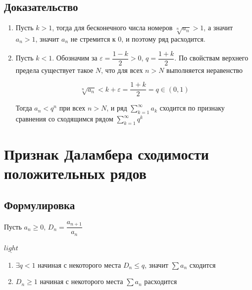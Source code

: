 \documentclass{article}
\begin{document}
        \subsection{Доказательство}
        
            \begin{enumerate}
            
                \item Пусть $k > 1$, тогда для бесконечного числа номеров $\sqrt[n]{a_n} > 1$, а значит $a_n > 1$, значит $a_n$ не стремится к $0$, и поэтому ряд расходится.
                
                \item Пусть $k < 1$. Обозначим за $\varepsilon = \dfrac{1 - k}{2} > 0$, $q = \dfrac{1 + k}{2}$. По свойствам верхнего предела существует такое $N$, что для всех $n > N$ выполняется неравенство 
                
                    $$\sqrt[n]{a_n} < k + \varepsilon = \dfrac{1 + k}{2} = q \in (0, 1)$$
                    
                    Тогда $a_n < q^n$ при всех $n > N$, и ряд $\sum\limits^{\infty}_{k = 1} a_k$ сходится по признаку сравнения со сходящимся рядом $\sum\limits^{\infty}_{k = 1} q^k$
                
            \end{enumerate}
            
    \newpage
    
    \section{Признак Даламбера сходимости положительных рядов}
    
        \subsection{Формулировка}
        
            Пусть $a_n \geq 0$, $D_n = \dfrac{a_{n + 1}}{a_n}$
            
            $\underline{light}$
            
            \begin{enumerate}
            
                \item $\exists q < 1$ начиная с некоторого места $D_n \leq q$, значит $\sum a_n$ сходится
                
                \item $D_n \geq 1$ начиная с некоторого места $\sum a_n$ расходится
                
            \end{enumerate}
            
\end{document}
